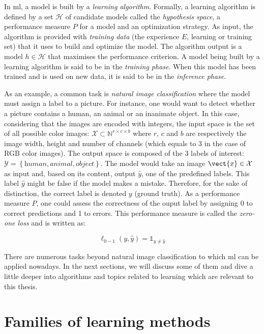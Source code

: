 In \acrlong{ml}, a model is built by a \textit{learning algorithm}. Formally, a
learning algorithm is defined by a set $\mathcal{H}$ of candidate models called
the \textit{hypothesis space}, a performance measure $P$ for a model and an
optimization strategy. As input, the algorithm is provided with \textit{training data}
(the experience $E$, \aka learning or training set) that it uses to build and
optimize the model. The algorithm output is a model $h \in \mathcal{H}$ that
maximises the performance criterion. A model being built by a learning algorithm
is said to be in the \textit{training phase}. When this model has been trained
and is used on new data, it is said to be in the \textit{inference phase}.

As an example, a common task is \textit{natural image classification} where the
model must assign a label to a picture. For instance, one would want to detect
whether a picture contains a human, an animal or an inanimate object. In this
case, considering that the images are encoded with integers, the input space is
the set of all possible color images: $\mathcal{X} \subset \mathbb{N}^{r\times c\times b}$
where $r$, $c$ and $b$ are respectively the image width, height and number of
channels (which equals to 3 in the case of RGB color images). The output space is
composed of the 3 labels of interest: $\mathcal{Y} = \left\{\textit{human}, \textit{animal}, \textit{object}\right\}$.
The model would take an image $\vect{x} \in \mathcal{X}$ as input and, based on
its content, output $\hat{y}$, one of the predefined labels. This label $\hat{y}$
might be false if the model makes a mistake. Therefore, for the sake of distinction,
the correct label is denoted $y$ (\aka ground truth). As a performance measure
$P$, one could assess the correctness of the ouput label by assigning 0 to correct
predictions and 1 to errors. This performance measure is called the \textit{zero-one loss}
and is written as:

\begin{equation}
\ell_{0-1}(y, \hat{y}) = \mathbb{1}_{y\neq\hat{y}}
\end{equation}

There are numerous tasks beyond natural image classification to which \acrlong{ml}
can be applied nowadays. In the next sections, we will discuss some of them and
dive a little deeper into algorithms and topics related to learning which are
relevant to this thesis.

\section{Families of learning methods}
\label{sec:backml:families}

